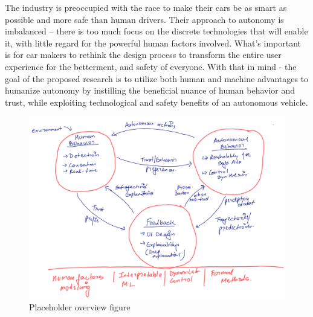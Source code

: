The industry is preoccupied with the race to make their cars be as smart as possible and more safe than human drivers.
Their approach to autonomy is imbalanced – there is too much focus on the discrete technologies that will enable it, with little regard for the powerful human factors involved. 
What's important is for car makers to rethink the design process to transform the entire user experience for the betterment, and safety of everyone. 
With that in mind - the goal of the proposed research is to utilize both human and machine advantages to humanize autonomy by instilling the beneficial nuance of human behavior and trust, while exploiting technological and safety benefits of an autonomous vehicle.

\begin{figure}
    \centering
    \includegraphics[width=0.6\columnwidth]{figures/overview.png}
    \caption{Placeholder overview figure}
    \label{fig:overview}
\end{figure}

